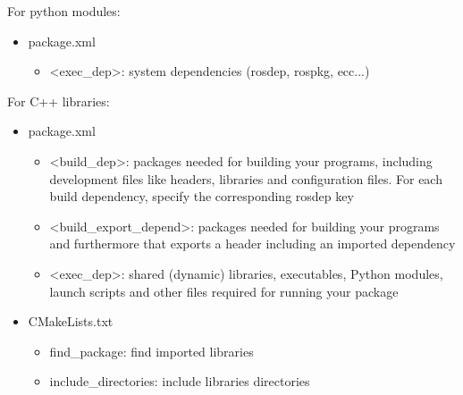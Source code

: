   For python modules:
  \begin{itemize}
    \item package.xml
    \begin{itemize}
      \item <exec\_dep>: system dependencies (rosdep, rospkg, ecc...)
    \end{itemize}
  \end{itemize}
  
  For C++ libraries:
  \begin{itemize}
    \item package.xml
    \begin{itemize}
      \item <build\_dep>: packages needed for building your programs, including development files like headers, libraries and configuration files. For each build dependency, specify the corresponding rosdep key
      \item <build\_export\_depend>: packages needed for building your programs and furthermore that exports a header including an imported dependency
      \item <exec\_dep>: shared (dynamic) libraries, executables, Python modules, launch scripts and other files required for running your package
    \end{itemize}
    \item CMakeLists.txt
    \begin{itemize}
      \item find\_package: find imported libraries
      \item include\_directories: include libraries directories
    \end{itemize}
  \end{itemize}


  